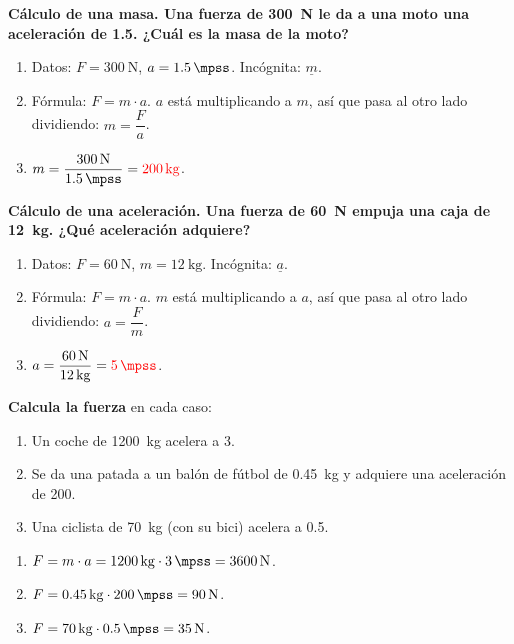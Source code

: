 \begin{example}
    \textbf{Cálculo de una masa. Una fuerza de \qty{300}{\newton} le da a una moto una aceleración de \qty{1.5}{\mpss}. ¿Cuál es la masa de la moto?}
    \begin{enumerate}[label=\numberballmDarkTeal]
        \item Datos: \(F = \qty{300}{\newton}\), \(a = \qty{1.5}{\mpss}\). Incógnita: \(\underline{m}\).
        \item Fórmula: \(F = m \cdot a\). \(a\) está multiplicando a \(m\), así que pasa al otro lado dividiendo: \(m = \dfrac{F}{a}\).
        \item \(m = \dfrac{\qty{300}{\newton}}{\qty{1.5}{\mpss}} = \textcolor{red}{\qty{200}{\kg}}\).
    \end{enumerate}
\end{example}

\begin{example}
    \textbf{Cálculo de una aceleración. Una fuerza de \qty{60}{\newton} empuja una caja de \qty{12}{\kg}. ¿Qué aceleración adquiere?}
    \begin{enumerate}[label=\numberballmDarkTeal]
        \item Datos: \(F = \qty{60}{\newton}\), \(m = \qty{12}{\kg}\). Incógnita: \(\underline{a}\).
        \item Fórmula: \(F = m \cdot a\). \(m\) está multiplicando a \(a\), así que pasa al otro lado dividiendo: \(a = \dfrac{F}{m}\).
        \item \(a = \dfrac{\qty{60}{\newton}}{\qty{12}{\kg}} = \textcolor{red}{\qty{5}{\mpss}}\).
    \end{enumerate}
\end{example}

\begin{exercise}
    \textbf{Calcula la fuerza} en cada caso:
    \begin{enumerate}[label=\letraminuscula]
        \item Un coche de \qty{1200}{\kg} acelera a \qty{3}{\mpss}.
        \item Se da una patada a un balón de fútbol de \qty{0.45}{\kg} y adquiere una aceleración de \qty{200}{\mpss}.
        \item Una ciclista de \qty{70}{\kg} (con su bici) acelera a \qty{0.5}{\mpss}.
    \end{enumerate}
    \begin{solu}
        \begin{enumerate}[label=\alph*)]
            \item \(F = m \cdot a = \qty{1200}{\kg} \cdot \qty{3}{\mpss} = \qty{3600}{\newton}\).
            \item \(F = \qty{0.45}{\kg} \cdot \qty{200}{\mpss} = \qty{90}{\newton}\).
            \item \(F = \qty{70}{\kg} \cdot \qty{0.5}{\mpss} = \qty{35}{\newton}\).
        \end{enumerate}
    \end{solu}
\end{exercise}

